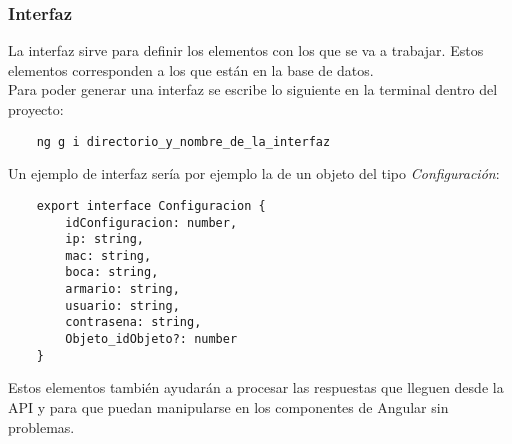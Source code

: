 \subsubsection{Interfaz}
La interfaz sirve para definir los elementos con los que se va a trabajar. Estos elementos corresponden a los que están en la base de datos.
\\Para poder generar una interfaz se escribe lo siguiente en la terminal dentro del proyecto:
\begin{verbatim}
    ng g i directorio_y_nombre_de_la_interfaz
\end{verbatim}
Un ejemplo de interfaz sería por ejemplo la de un objeto del tipo \textit{Configuración}:
\begin{verbatim}
    export interface Configuracion {
        idConfiguracion: number,
        ip: string,
        mac: string,
        boca: string,
        armario: string,
        usuario: string,
        contrasena: string,
        Objeto_idObjeto?: number
    }
\end{verbatim}
Estos elementos también ayudarán a procesar las respuestas que lleguen desde la API y para que puedan manipularse en los componentes de Angular sin problemas.